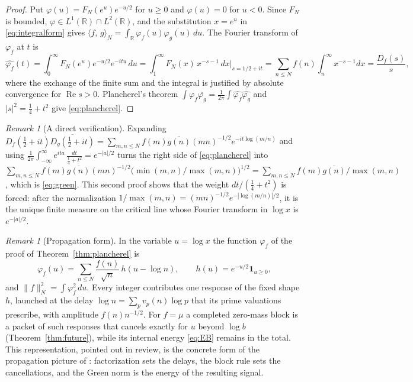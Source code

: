 \documentclass[11pt]{article}
\theoremstyle{definition}
\theoremstyle{remark}
\newtheorem{remark}[theorem]{Remark}
\newcommand{\R}{\mathbb{R}}
\newcommand{\ip}[2]{\langle #1,\, #2\rangle}
\DeclareMathOperator{\Ree}{Re}
\begin{document}
\begin{proof}
Put $\varphi(u)=F_N(e^u)e^{-u/2}$ for $u\ge0$ and $\varphi(u)=0$ for $u<0$. Since $F_N$ is bounded, $\varphi\in L^1(\R)\cap L^2(\R)$, and the substitution $x=e^u$ in \eqref{eq:integralform} gives $\ip{f}{g}_N=\int_\R\varphi_f(u)\overline{\varphi_g(u)}\,du$. The Fourier transform of $\varphi_f$ at $t$ is
\[
\widehat{\varphi_f}(t)=\int_0^\infty F_N(e^u)e^{-u/2}e^{-itu}\,du=\int_1^\infty F_N(x)\,x^{-s-1}\,dx\Big|_{s=1/2+it}
=\sum_{n\le N}f(n)\int_n^\infty x^{-s-1}dx=\frac{D_f(s)}{s},
\]
where the exchange of the finite sum and the integral is justified by absolute convergence for $\Ree s>0$. Plancherel's theorem $\int\varphi_f\overline{\varphi_g}=\frac1{2\pi}\int\widehat{\varphi_f}\overline{\widehat{\varphi_g}}$ and $|s|^2=\frac14+t^2$ give \eqref{eq:plancherel}.
\end{proof}

\begin{remark}[A direct verification]
Expanding $D_f(\frac12+it)\overline{D_g(\frac12+it)}=\sum_{m,n\le N}f(m)\overline{g(n)}(mn)^{-1/2}e^{-it\log(m/n)}$ and using $\frac1{2\pi}\int_{-\infty}^\infty e^{ita}\,\frac{dt}{\frac14+t^2}=e^{-|a|/2}$ turns the right side of \eqref{eq:plancherel} into $\sum_{m,n\le N}f(m)\overline{g(n)}(mn)^{-1/2}\big(\min(m,n)/\max(m,n)\big)^{1/2}=\sum_{m,n\le N}f(m)\overline{g(n)}/\max(m,n)$, which is \eqref{eq:green}. This second proof shows that the weight $dt/(\frac14+t^2)$ is forced: after the normalization $1/\max(m,n)=(mn)^{-1/2}e^{-|\log(m/n)|/2}$, it is the unique finite measure on the critical line whose Fourier transform in $\log x$ is $e^{-|a|/2}$.
\end{remark}

\begin{remark}[Propagation form]\label{rem:propagation}
In the variable $u=\log x$ the function $\varphi_f$ of the proof of Theorem~\ref{thm:plancherel} is
\[
\varphi_f(u)=\sum_{n\le N}\frac{f(n)}{\sqrt n}\,h(u-\log n),\qquad h(u)=e^{-u/2}\mathbf 1_{u\ge0},
\]
and $\|f\|_N^2=\int\varphi_f^2\,du$. Every integer contributes one response of the fixed shape $h$, launched at the delay $\log n=\sum_p v_p(n)\log p$ that its prime valuations prescribe, with amplitude $f(n)n^{-1/2}$. For $f=\mu$ a completed zero-mass block is a packet of such responses that cancels exactly for $u$ beyond $\log b$ (Theorem~\ref{thm:future}), while its internal energy \eqref{eq:EB} remains in the total. This representation, pointed out in review, is the concrete form of the propagation picture of \cite{michaels-colors}: factorization sets the delays, the block rule sets the cancellations, and the Green norm is the energy of the resulting signal.
\end{remark}
\end{document}
